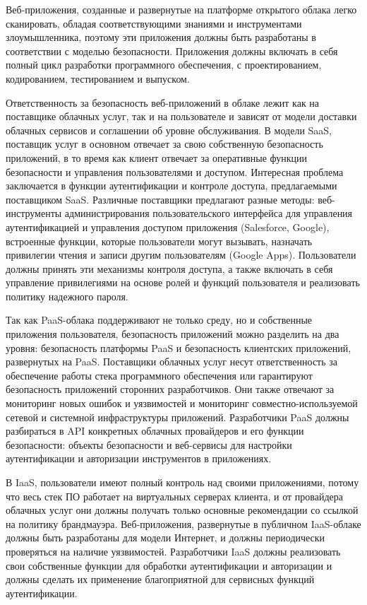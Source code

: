 Веб-приложения, созданные и развернутые на платформе открытого облака легко сканировать, обладая соответствующими знаниями и инструментами злоумышленника, поэтому эти приложения должны быть разработаны в соответствии с моделью безопасности.
Приложения должны включать в себя полный цикл разработки программного обеспечения, с проектированием, кодированием, тестированием и выпуском.

Ответственность за безопасность веб-приложений в облаке лежит как на поставщике облачных услуг, так и на пользователе и зависят от модели доставки облачных сервисов и соглашении об уровне обслуживания.
В модели SaaS, поставщик услуг в основном отвечает за свою собственную безопасность приложений, в то время как клиент отвечает за оперативные функции безопасности и управления пользователями и доступом.
Интересная проблема заключается в функции аутентификации и контроле доступа, предлагаемыми поставщиком SaaS.
Различные поставщики предлагают разные методы: веб-инструменты администрирования пользовательского интерфейса для управления аутентификацией и управления доступом приложения (Salesforce, Google), встроенные функции, которые пользователи могут вызывать, назначать привилегии чтения и записи другим пользователям (Google Apps).
Пользователи должны принять эти механизмы контроля доступа, а также включать в себя управление привилегиями на основе ролей и функций пользователя и реализовать политику надежного пароля.

Так как PaaS-облака поддерживают не только среду, но и собственные приложения пользователя, безопасность приложений можно разделить на два уровня: безопасность платформы PaaS и безопасность клиентских приложений, развернутых на PaaS.
Поставщики облачных услуг несут ответственность за обеспечение работы стека программного обеспечения или гарантируют безопасность приложений сторонних разработчиков.
Они также отвечают за мониторинг новых ошибок и уязвимостей и мониторинг совместно-используемой сетевой и системной инфраструктуры приложений.
Разработчики PaaS должны разбираться в API конкретных облачных провайдеров и его функции безопасности: объекты безопасности и веб-сервисы для настройки аутентификации и авторизации инструментов в приложениях.

В IaaS, пользователи имеют полный контроль над своими приложениями, потому что весь стек ПО работает на виртуальных серверах клиента, и от провайдера облачных услуг они должны получать только основные рекомендации со ссылкой на политику брандмауэра.
Веб-приложения, развернутые в публичном IaaS-облаке должны быть разработаны для модели Интернет, и должны периодически проверяться на наличие уязвимостей.
Разработчики IaaS должны реализовать свои собственные функции для обработки аутентификации и авторизации и должны сделать их применение благоприятной для сервисных функций аутентификации.

